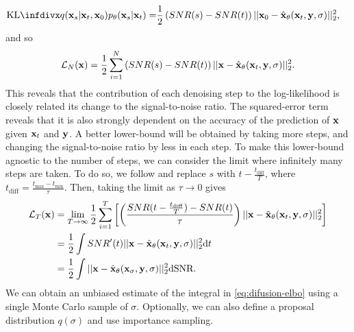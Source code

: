 \begin{align}
\kl{q(\rvx_{s} | \rvx_{t}, \rvx_0)}{p_\theta(\rvx_{s} | \rvx_{t})} = &\frac{1}{2} \left( SNR(s) - SNR(t) \right) || \rvx_0 - \hat{\rvx}_\theta(\rvx_t, \rvy, \sigma) ||_2^2,
\end{align}
and so
\begin{align}
    \mathcal{L}_N({\mathbf{x}}) = \frac{1}{2} \sum_{i=1}^N \left( SNR(s) - SNR(t) \right) || {\mathbf{x}} - \hat{{\mathbf{x}}}_\theta({\mathbf{x}}_t, {\mathbf{y}}, \sigma) ||_2^2.
\end{align}
This reveals that the contribution of each denoising step to the log-likelihood is closely related its change to the signal-to-noise ratio. The squared-error term reveals that it is also strongly dependent on the accuracy of the prediction of ${\mathbf{x}}$ given ${\mathbf{x}}_t$ and ${\mathbf{y}}$. A better lower-bound will be obtained by taking more steps, and changing the signal-to-noise ratio by less in each step. To make this lower-bound agnostic to the number of steps, we can consider the limit where infinitely many steps are taken. To do so, we  follow \citet{kingma2021variational} and replace $s$ with $t-\frac{t_\text{diff}}{T}$, where $t_\text{diff} = \frac{t_\text{max}-t_\text{min}}{\tau}$. Then, taking the limit as $\tau \rightarrow 0$ gives 
\begin{align}
    \mathcal{L}_T({\mathbf{x}}) &= \lim_{T\rightarrow\infty} \frac{1}{2} \sum_{i=1}^T \left[ \left( \frac{SNR(t-\frac{t_\text{diff}}{T}) - SNR(t)}{\tau} \right) || {\mathbf{x}} - \hat{{\mathbf{x}}}_\theta({\mathbf{x}}_t, {\mathbf{y}}, \sigma) ||_2^2 \right] \\
    &= \frac{1}{2} \int SNR'(t) || {\mathbf{x}} - \hat{{\mathbf{x}}}_\theta({\mathbf{x}}_t, {\mathbf{y}}, \sigma) ||_2^2 \mathrm{d}t \label{eq:difusion-elbo} \\
    &= \frac{1}{2} \int || {\mathbf{x}} - \hat{{\mathbf{x}}}_\theta({\mathbf{x}}_\sigma, {\mathbf{y}}, \sigma) ||_2^2 \mathrm{d}\text{SNR}.
\end{align}
We can obtain an unbiased estimate of the integral in \cref{eq:difusion-elbo} using a single Monte Carlo sample of $\sigma$. Optionally, we can also define a proposal distribution $q(\sigma)$ and use importance sampling.


